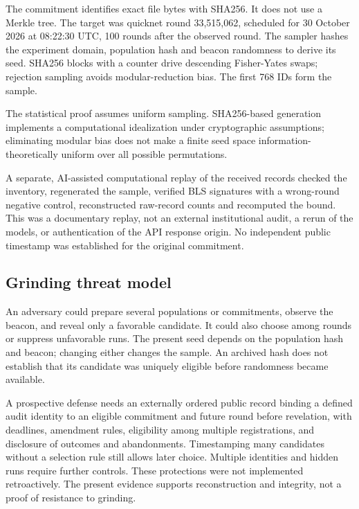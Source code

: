 \documentclass[
  10pt,
]{article}
\begin{document}
The commitment identifies exact file bytes with SHA256. It does not use
a Merkle tree. The target was quicknet round 33,515,062, scheduled for
30 October 2026 at 08:22:30 UTC, 100 rounds after the observed round.
The sampler hashes the experiment domain, population hash and beacon
randomness to derive its seed. SHA256 blocks with a counter drive
descending Fisher-Yates swaps; rejection sampling avoids
modular-reduction bias. The first 768 IDs form the sample.

The statistical proof assumes uniform sampling. SHA256-based generation
implements a computational idealization under cryptographic assumptions;
eliminating modular bias does not make a finite seed space
information-theoretically uniform over all possible permutations.

A separate, AI-assisted computational replay of the received records
checked the inventory, regenerated the sample, verified BLS signatures
with a wrong-round negative control, reconstructed raw-record counts and
recomputed the bound. This was a documentary replay, not an external
institutional audit, a rerun of the models, or authentication of the API
response origin. No independent public timestamp was established for the
original commitment.

\hypertarget{grinding-threat-model}{%
\subsection{Grinding threat model}\label{grinding-threat-model}}

An adversary could prepare several populations or commitments, observe
the beacon, and reveal only a favorable candidate. It could also choose
among rounds or suppress unfavorable runs. The present seed depends on
the population hash and beacon; changing either changes the sample. An
archived hash does not establish that its candidate was uniquely
eligible before randomness became available.

A prospective defense needs an externally ordered public record binding
a defined audit identity to an eligible commitment and future round
before revelation, with deadlines, amendment rules, eligibility among
multiple registrations, and disclosure of outcomes and abandonments.
Timestamping many candidates without a selection rule still allows later
choice. Multiple identities and hidden runs require further controls.
These protections were not implemented retroactively. The present
evidence supports reconstruction and integrity, not a proof of
resistance to grinding.
\end{document}
